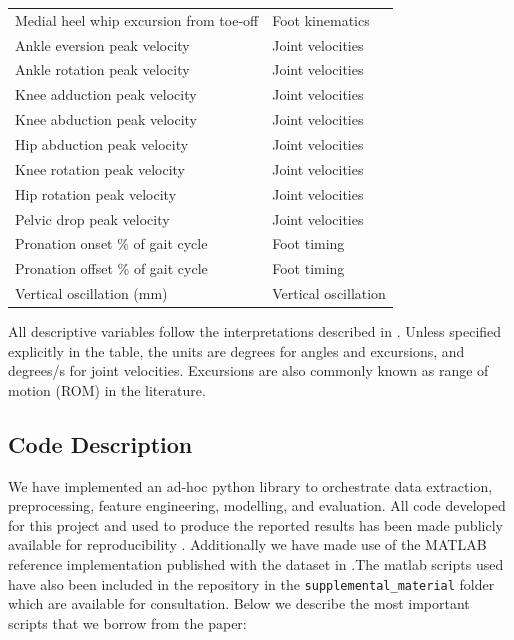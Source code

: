 \begin{table}[ht]
\begin{tabular}{lp{}}
    Medial heel whip excursion from toe-off & Foot kinematics \\
    Ankle eversion peak velocity & Joint velocities \\
    Ankle rotation peak velocity & Joint velocities \\
    Knee adduction peak velocity & Joint velocities \\
    Knee abduction peak velocity & Joint velocities \\
    Hip abduction peak velocity & Joint velocities \\
    Knee rotation peak velocity & Joint velocities \\
    Hip rotation peak velocity & Joint velocities \\
    Pelvic drop peak velocity & Joint velocities \\
    Pronation onset \% of gait cycle & Foot timing \\
    Pronation offset \% of gait cycle & Foot timing \\
    Vertical oscillation (mm) & Vertical oscillation \\
    \hline
    \end{tabular}
\end{table}

All descriptive variables follow the interpretations described in \citet{Bartlett2014}. Unless specified explicitly in the table, the units are degrees for angles and excursions, and degrees/s for joint velocities. Excursions are also commonly known as range of motion (ROM) in the literature. 

\subsection{Code Description}\label{subsec:method-code-description}
We have implemented an ad-hoc python library to orchestrate data extraction, preprocessing, feature engineering, modelling, and evaluation. All code developed for this project and used to produce the reported results has been made publicly available for reproducibility \cite{Zapater_Reig_Running_Injury_Clinic}. Additionally we have made use of the MATLAB reference implementation published with the dataset in \cite{Ferber2024}.The matlab scripts used have also been included in the repository in the \texttt{supplemental\_material} folder which are available for consultation. Below we describe the most important scripts that we borrow from the paper:

